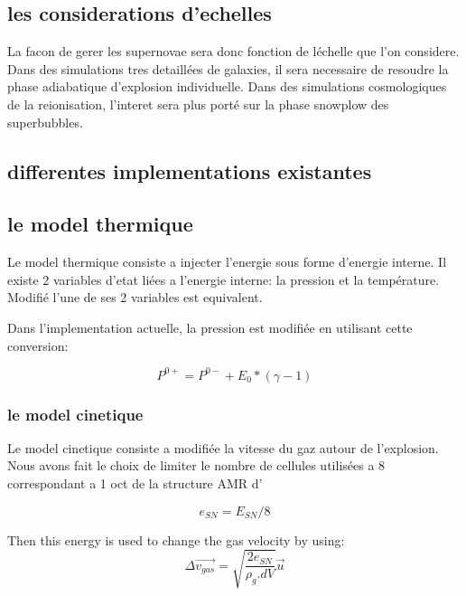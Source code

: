 \subsection{les considerations d'echelles}
La facon de gerer les supernovae sera donc fonction de léchelle que l'on considere.
Dans des simulations tres detaillées de galaxies, il sera necessaire de resoudre la phase adiabatique d'explosion individuelle.
Dans des simulations cosmologiques de la reionisation, l'interet sera plus porté sur la phase snowplow des superbubbles.


\subsection{ differentes implementations existantes}


\subsection{le model thermique}
Le model thermique consiste a injecter l'energie sous forme d'energie interne.
Il existe 2 variables d'etat liées a l'energie interne: la pression et la température.
Modifié l'une de ses 2 variables est equivalent.

Dans l'implementation actuelle, la pression est modifiée en utilisant cette conversion:

\begin{equation}
P^{0+} = P^{0-}  + E_0 * (\gamma-1)
\end{equation}



\subsubsection{le model cinetique}

Le model cinetique consiste a modifiée la vitesse du gaz autour de l'explosion.
Nous avons fait le choix de limiter le nombre de cellules utilisées a 8 correspondant a 1 oct de la structure AMR d'\emma


\begin{equation}
e_{SN} = E_{SN}/8
\end{equation}

Then this energy is used to change the gas velocity by using:
\begin{equation}
    \Delta \overrightarrow{v_{gas}} = \sqrt{\frac{2e_{SN}}{\rho_g.dV}} \overrightarrow{u}
    \label{eq_sn_direct}
\end{equation}


